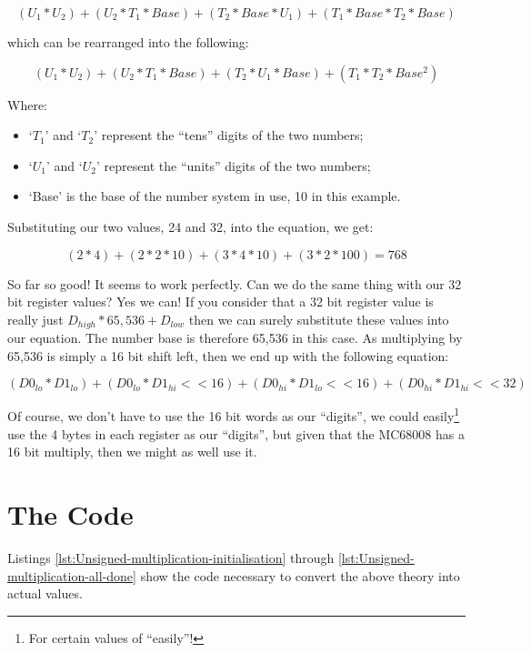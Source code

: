 \[
\left(U_{1}*U_{2}\right)+\left(U_{2}*T_{1}*Base\right)+\left(T_{2}*Base*U_{1}\right)+\left(T_{1}*Base*T_{2}*Base\right)
\]

which can be rearranged into the following:

\[
\left(U_{1}*U_{2}\right)+\left(U_{2}*T_{1}*Base\right)+\left(T_{2}*U_{1}*Base\right)+\left(T_{1}*T_{2}*Base^{2}\right)
\]

Where:
\begin{itemize}
\item `$T_{1}$' and `$T_{2}$' represent the ``tens'' digits of the two
numbers;
\item `$U_{1}$' and `$U_{2}$' represent the ``units'' digits of the
two numbers;
\item `Base' is the base of the number system in use, 10 in this example.
\end{itemize}
Substituting our two values, 24 and 32, into the equation, we get:

\[
\left(2*4\right)+\left(2*2*10\right)+\left(3*4*10\right)+\left(3*2*100\right)=768
\]

So far so good! It seems to work perfectly. Can we do the same thing
with our 32 bit register values? Yes we can! If you consider that
a 32 bit register value is really just $D_{high}*65,536+D_{low}$
then we can surely substitute these values into our equation. The
number base is therefore 65,536 in this case. As multiplying by 65,536
is simply a 16 bit shift left, then we end up with the following equation:

\[
\left(D0_{lo}*D1_{lo}\right)+\left(D0_{lo}*D1_{hi}<<16\right)+\left(D0_{hi}*D1_{lo}<<16\right)+\left(D0_{hi}*D1_{hi}<<32\right)
\]

Of course, we don't have to use the 16 bit words as our ``digits'',
we could easily\footnote{For certain values of ``easily''!} use the
4 bytes in each register as our ``digits'', but given that the MC68008
has a 16 bit multiply, then we might as well use it. 

\section{The Code}

Listings \ref{lst:Unsigned-multiplication-initialisation} through
\ref{lst:Unsigned-multiplication-all-done} show the code necessary
to convert the above theory into actual values.



